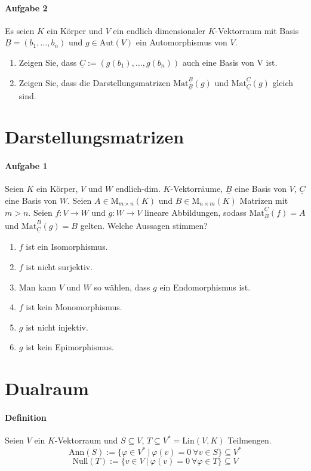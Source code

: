 \documentclass{scrartcl}
\begin{document}
	\paragraph{Aufgabe 2}
	Es seien $K$ ein Körper und $V$ ein endlich dimensionaler $K$-Vektorraum
	mit Basis $\underline{B}=(b_1,\dots,b_n)$
	und $g\in\text{Aut}(V)$ ein Automorphismus von $V$.
	\begin{enumerate}[label=(\alph*)]
		\item Zeigen Sie, dass $\underline{C}:=(g(b_1),\dots,g(b_n))$ auch eine Basis von V ist.
		\item Zeigen Sie, dass die Darstellungsmatrizen
			$\text{Mat}_{\underline{B}}^{\underline{B}}(g)$
			und $\text{Mat}_{\underline{C}}^{\underline{C}}(g)$ gleich sind.
	\end{enumerate}
	\section{Darstellungsmatrizen}
	\paragraph{Aufgabe 1}
	Seien $K$ ein Körper, $V$ und $W$ endlich-dim. $K$-Vektorräume,
	$\underline{B}$ eine Basis von $V$, $\underline{C}$ eine Basis von $W$.
	Seien $A\in\text{M}_{m\times n}(K)$ und $B\in\text{M}_{n\times m}(K)$ Matrizen mit $m>n$.
	Seien $f: V\to W$ und $g: W\to V$ lineare Abbildungen, sodass $\text{Mat}_{\underline{B}}^{\underline{C}}(f)=A$
	und $\text{Mat}_{\underline{C}}^{\underline{B}}(g)=B$ gelten.
	Welche Aussagen stimmen?
	\begin{enumerate}[label=(\alph*)]
		\item $f$ ist ein Isomorphismus.
		\item $f$ ist nicht surjektiv.
		\item Man kann $V$ und $W$ so wählen, dass $g$ ein Endomorphismus ist.
		\item $f$ ist kein Monomorphismus.
		\item $g$ ist nicht injektiv.
		\item $g$ ist kein Epimorphismus.
	\end{enumerate}
	\section{Dualraum}
	\paragraph{Definition}
	Seien $V$ ein $K$-Vektorraum und $S\subseteq V$, $T\subseteq V^*=\text{Lin}(V,K)$ Teilmengen.
	\[\text{Ann}(S):=\{\varphi\in V^*\ \vert\ \varphi(v)=0\ \forall v\in S\}\subseteq V^*\]
	\[\text{Null}(T):=\{v\in V\ \vert\ \varphi(v)=0\ \forall\varphi\in T\}\subseteq V\]
\end{document}
